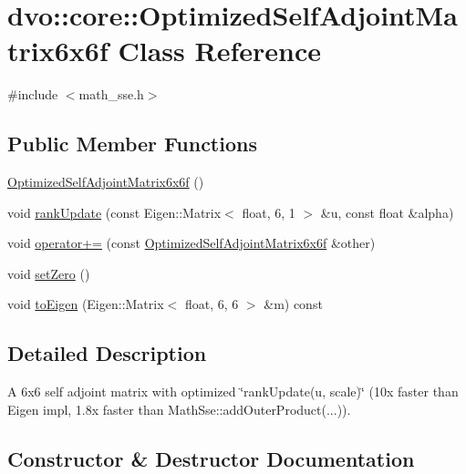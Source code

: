\hypertarget{classdvo_1_1core_1_1_optimized_self_adjoint_matrix6x6f}{}\section{dvo\+:\+:core\+:\+:Optimized\+Self\+Adjoint\+Matrix6x6f Class Reference}
\label{classdvo_1_1core_1_1_optimized_self_adjoint_matrix6x6f}


{\ttfamily \#include $<$math\+\_\+sse.\+h$>$}

\subsection*{Public Member Functions}
\begin{DoxyCompactItemize}
\item 
\mbox{\hyperlink{classdvo_1_1core_1_1_optimized_self_adjoint_matrix6x6f_a7492e92fafeb8571602abdedbfe28ebf}{Optimized\+Self\+Adjoint\+Matrix6x6f}} ()
\item 
void \mbox{\hyperlink{classdvo_1_1core_1_1_optimized_self_adjoint_matrix6x6f_a37a35da097b4bf2acbdbc5940c0742c8}{rank\+Update}} (const Eigen\+::\+Matrix$<$ float, 6, 1 $>$ \&u, const float \&alpha)
\item 
void \mbox{\hyperlink{classdvo_1_1core_1_1_optimized_self_adjoint_matrix6x6f_aba5627b7a649121f67fa7ba8b8bdc853}{operator+=}} (const \mbox{\hyperlink{classdvo_1_1core_1_1_optimized_self_adjoint_matrix6x6f}{Optimized\+Self\+Adjoint\+Matrix6x6f}} \&other)
\item 
void \mbox{\hyperlink{classdvo_1_1core_1_1_optimized_self_adjoint_matrix6x6f_a3883546f5cdada48519e418f6772c9e5}{set\+Zero}} ()
\item 
void \mbox{\hyperlink{classdvo_1_1core_1_1_optimized_self_adjoint_matrix6x6f_abfddccffb0b8e843140a2c7c3d0b4cc0}{to\+Eigen}} (Eigen\+::\+Matrix$<$ float, 6, 6 $>$ \&m) const
\end{DoxyCompactItemize}


\subsection{Detailed Description}
A 6x6 self adjoint matrix with optimized \char`\"{}rank\+Update(u, scale)\char`\"{} (10x faster than Eigen impl, 1.\+8x faster than Math\+Sse\+::add\+Outer\+Product(...)). 

\subsection{Constructor \& Destructor Documentation}
\mbox{\label{classdvo_1_1core_1_1_optimized_self_adjoint_matrix6x6f_a7492e92fafeb8571602abdedbfe28ebf}} 
